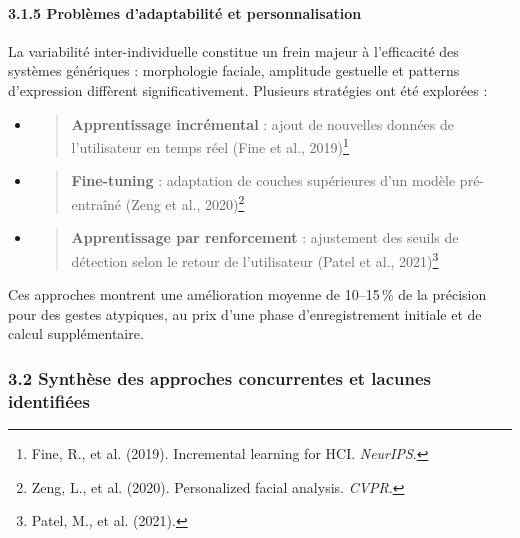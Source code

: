 \documentclass[
]{article}
\begin{document}
\hypertarget{probluxe8mes-dadaptabilituxe9-et-personnalisation}{%
\paragraph{3.1.5 Problèmes d'adaptabilité et personnalisation}\label{probluxe8mes-dadaptabilituxe9-et-personnalisation}}

La variabilité inter-individuelle constitue un frein majeur à l'efficacité des systèmes génériques : morphologie faciale, amplitude gestuelle et patterns d'expression diffèrent significativement. Plusieurs stratégies ont été explorées :

\begin{itemize}
\item
  \begin{quote}
  \textbf{Apprentissage incrémental} : ajout de nouvelles données de l'utilisateur en temps réel (Fine et al., 2019)\footnote{Fine, R., et al. (2019). Incremental learning for HCI. \emph{NeurIPS}.}\href{https://chatgpt.com/c/68553213-03fc-800c-bed3-82b785e68d7a\#user-content-fn-23}{\textsuperscript{\underline{\hfill\break
  }}}
  \end{quote}
\item
  \begin{quote}
  \textbf{Fine-tuning} : adaptation de couches supérieures d'un modèle pré-entraîné (Zeng et al., 2020)\footnote{Zeng, L., et al. (2020). Personalized facial analysis. \emph{CVPR}.}\href{https://chatgpt.com/c/68553213-03fc-800c-bed3-82b785e68d7a\#user-content-fn-24}{\textsuperscript{\underline{\hfill\break
  }}}
  \end{quote}
\item
  \begin{quote}
  \textbf{Apprentissage par renforcement} : ajustement des seuils de détection selon le retour de l'utilisateur (Patel et al., 2021)\footnote{Patel, M., et al. (2021).}\href{https://chatgpt.com/c/68553213-03fc-800c-bed3-82b785e68d7a\#user-content-fn-25}{\textsuperscript{\underline{\hfill\break
  }}}
  \end{quote}
\end{itemize}

Ces approches montrent une amélioration moyenne de 10--15\,\% de la précision pour des gestes atypiques, au prix d'une phase d'enregistrement initiale et de calcul supplémentaire.

\hypertarget{synthuxe8se-des-approches-concurrentes-et-lacunes-identifiuxe9es}{%
\subsubsection{3.2 Synthèse des approches concurrentes et lacunes identifiées}\label{synthuxe8se-des-approches-concurrentes-et-lacunes-identifiuxe9es}}
\end{document}

